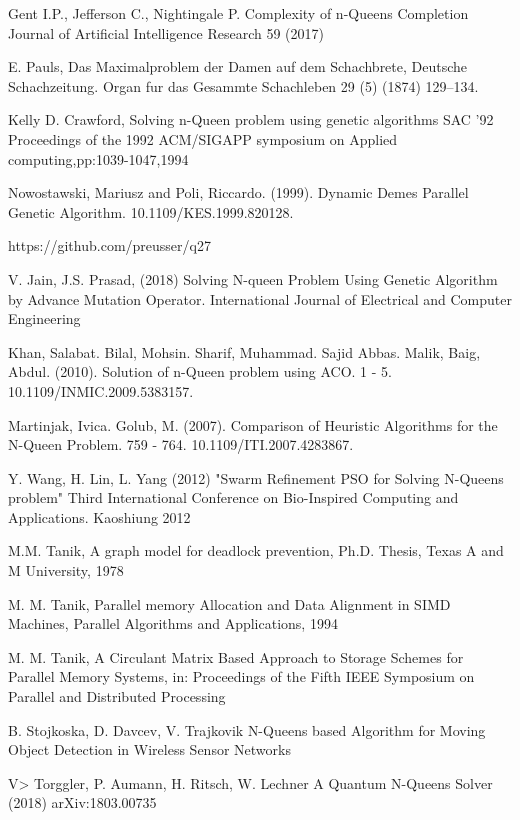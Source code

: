\documentclass[a4paper,onecolumn,11pt]{article}
\begin{document}
\begin{thebibliography}{99.}

 Gent I.P., Jefferson C., Nightingale P. 	Complexity of n-Queens Completion Journal of Artificial Intelligence Research 59 (2017) 

 E. Pauls, Das Maximalproblem der Damen auf dem Schachbrete, Deutsche Schachzeitung. Organ fur das Gesammte Schachleben 29 (5) (1874) 129–134.

 Kelly D. Crawford, Solving n-Queen problem using genetic algorithms SAC '92 Proceedings of the 1992 ACM/SIGAPP symposium on Applied computing,pp:1039-1047,1994 

 Nowostawski, Mariusz and Poli, Riccardo. (1999). Dynamic Demes Parallel Genetic Algorithm. 10.1109/KES.1999.820128. 

 https://github.com/preusser/q27

 V. Jain, J.S. Prasad, (2018) Solving N-queen Problem Using Genetic Algorithm by Advance Mutation Operator. International Journal of Electrical and Computer Engineering

 Khan, Salabat. Bilal, Mohsin. Sharif, Muhammad. Sajid Abbas. Malik, Baig, Abdul. (2010). Solution of n-Queen problem using ACO. 1 - 5. 10.1109/INMIC.2009.5383157. 

 Martinjak, Ivica. Golub, M. (2007). Comparison of Heuristic Algorithms for the N-Queen Problem. 759 - 764. 10.1109/ITI.2007.4283867.

  Y. Wang, H. Lin, L. Yang (2012) "Swarm Refinement PSO for Solving N-Queens problem" Third International Conference on Bio-Inspired Computing and Applications. Kaoshiung 2012

 M.M. Tanik, A graph model for deadlock prevention, Ph.D. Thesis, Texas A and M University, 1978

 M. M. Tanik, Parallel memory Allocation and Data Alignment in SIMD Machines, Parallel Algorithms and Applications, 1994

 M. M. Tanik, A Circulant Matrix Based Approach to Storage Schemes for Parallel Memory Systems,  in: Proceedings of the Fifth IEEE Symposium on Parallel and Distributed Processing

 B. Stojkoska, D. Davcev, V. Trajkovik N-Queens based Algorithm for Moving Object Detection in Wireless Sensor Networks

 V> Torggler, P. Aumann, H. Ritsch, W. Lechner A Quantum N-Queens Solver (2018) 	arXiv:1803.00735 


\end{thebibliography}
\end{document}
